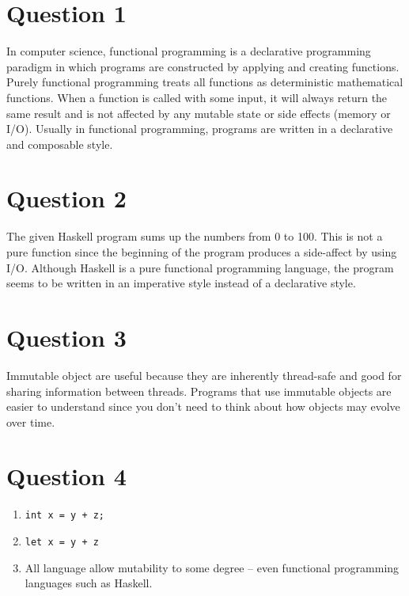 \documentclass[8pt, letterpaper, titlepage]{article}
\title{\textbf{\Huge{ 
\begin{center}
ECE 421\\ \large{A1} %
\end{center} 
}}}
\author{Lora Ma}
\begin{document}
\section*{Question 1}
In computer science, functional programming is a declarative programming paradigm in which programs are constructed by applying and creating functions. Purely functional programming treats all functions as deterministic mathematical functions. When a function is called with some input, it will always return the same result and is not affected by any mutable state or side effects (memory or I/O). Usually in functional programming, programs are written in a declarative and composable style.

\section*{Question 2}
The given Haskell program sums up the numbers from 0 to 100. This is not a pure function since the beginning of the program produces a side-affect by using I/O. Although Haskell is a pure functional programming language, the program seems to be written in an imperative style instead of a declarative style.

\section*{Question 3}
Immutable object are useful because they are inherently thread-safe and good for sharing information between threads. Programs that use immutable objects are easier to understand since you don't need to think about how objects may evolve over time. 

\section*{Question 4}
\begin{enumerate}[label=\alph*.]
  \item \lstinline{int x = y + z;}
  \item \lstinline{let x = y + z}
  \item All language allow mutability to some degree -- even functional programming languages such as Haskell.
\end{enumerate}
\end{document}
